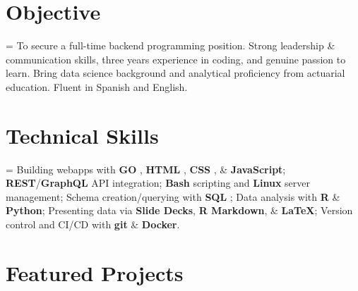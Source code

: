 \documentclass[12pt]{article}
\newcommand{\itemspace}[0]{
  \vspace{0.3170em}
}
\renewcommand{\textsc}[1]{%
  \uppercase{\footnotesize#1}\normalsize
}
\begin{document}
\maketitle

\itemspace

\vfill
\section{Objective}

\hangindent=\parindent %
To secure a full-time backend programming position.
Strong leadership \& communication skills, three years experience in coding,
and genuine passion to learn. Bring data science background and analytical
proficiency from actuarial education. Fluent in Spanish and English.

\itemspace

\section{Technical Skills}

\hangindent=\parindent %
Building webapps with \textbf{\textsc{go}}, \textbf{\textsc{html}}, \textbf{\textsc{css}},
  \& \textbf{JavaScript};
\textbf{REST}/\textbf{GraphQL} API integration;
\textbf{Bash} scripting and \textbf{Linux} server management;
Schema creation/querying with \textbf{\textsc{sql}};
Data analysis with \textbf{\textsc{r}} \& \textbf{Python};
Presenting data via \textbf{Slide Decks}, \textbf{R Markdown},
  \& \textbf{\LaTeX{}};
Version control and CI/CD with \textbf{git} \& \textbf{Docker}.

\itemspace

\section{Featured Projects}

\vspace{-2mm} %
\end{document}
